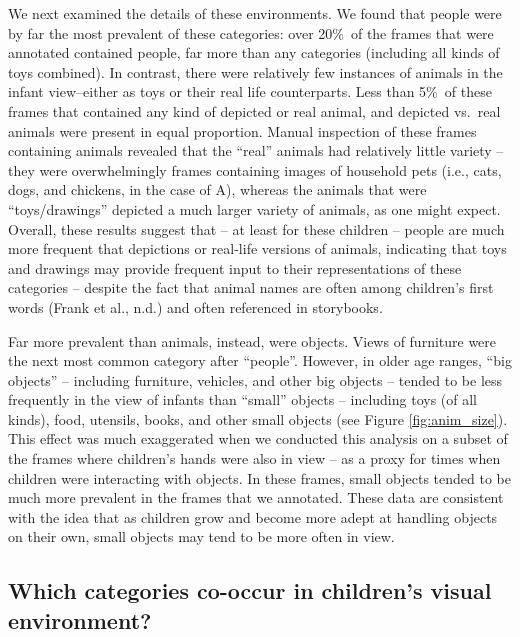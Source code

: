 \documentclass[10pt, letterpaper]{article}
\begin{document}
We next examined the details of these environments. We found that people
were by far the most prevalent of these categories: over 20\%~of the
frames that were annotated contained people, far more than any
categories (including all kinds of toys combined). In contrast, there
were relatively few instances of animals in the infant view--either as
toys or their real life counterparts. Less than 5\%~of these frames that
contained any kind of depicted or real animal, and depicted vs.~real
animals were present in equal proportion. Manual inspection of these
frames containing animals revealed that the ``real'' animals had
relatively little variety -- they were overwhelmingly frames containing
images of household pets (i.e., cats, dogs, and chickens, in the case of
A), whereas the animals that were ``toys/drawings'' depicted a much
larger variety of animals, as one might expect. Overall, these results
suggest that -- at least for these children -- people are much more
frequent that depictions or real-life versions of animals, indicating
that toys and drawings may provide frequent input to their
representations of these categories -- despite the fact that animal
names are often among children's first words (Frank et al., n.d.) and
often referenced in storybooks.

Far more prevalent than animals, instead, were objects. Views of
furniture were the next most common category after ``people''. However,
in older age ranges, ``big objects'' -- including furniture, vehicles,
and other big objects -- tended to be less frequently in the view of
infants than ``small'' objects -- including toys (of all kinds), food,
utensils, books, and other small objects (see Figure
\ref{fig:anim_size}). This effect was much exaggerated when we conducted
this analysis on a subset of the frames where children's hands were also
in view -- as a proxy for times when children were interacting with
objects. In these frames, small objects tended to be much more prevalent
in the frames that we annotated. These data are consistent with the idea
that as children grow and become more adept at handling objects on their
own, small objects may tend to be more often in view.

\hypertarget{which-categories-co-occur-in-childrens-visual-environment}{%
\subsection{Which categories co-occur in children's visual
environment?}\label{which-categories-co-occur-in-childrens-visual-environment}}
\end{document}
